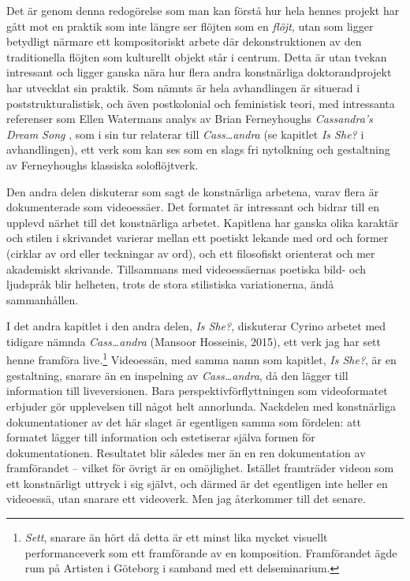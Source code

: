 \documentclass[11pt]{article}
\begin{document}
Det är genom denna redogörelse som man kan förstå hur hela hennes projekt har gått mot en praktik som inte längre ser flöjten som en \emph{flöjt}, utan som ligger betydligt närmare ett kompositoriskt arbete där dekonstruktionen av den traditionella flöjten som kulturellt objekt står i centrum. Detta är utan tvekan intressant och ligger ganska nära hur flera andra konstnärliga doktorandprojekt har utvecklat sin praktik. Som nämnts är hela avhandlingen är situerad i poststrukturalistisk, och även postkolonial och feministisk teori, med intressanta referenser som Ellen Watermans analys av Brian Ferneyhoughs \emph{Cassandra's Dream Song} \citep{Waterman1994}, som i sin tur relaterar till \emph{Cass\ldots{}andra} (se kapitlet \emph{Is She?} i avhandlingen), ett verk som kan ses som en slags fri nytolkning och gestaltning av Ferneyhoughs klassiska soloflöjtverk.

Den andra delen diskuterar som sagt de konstnärliga arbetena, varav flera är dokumenterade som videoessäer. Det formatet är intressant och bidrar till en upplevd närhet till det konstnärliga arbetet. Kapitlena har ganska olika karaktär och stilen i skrivandet varierar mellan ett poetiskt lekande med ord och former (cirklar av ord eller teckningar av ord), och ett filosofiskt orienterat och mer akademiskt skrivande. Tillsammans med videoessäernas poetiska bild- och ljudspråk blir helheten, trots de stora stilistiska variationerna, ändå sammanhållen.

I det andra kapitlet i den andra delen, \emph{Is She?}, diskuterar Cyrino arbetet med tidigare nämnda \emph{Cass\ldots{}andra} (Mansoor Hosseinis, 2015), ett verk jag har sett henne framföra live.\footnote{\emph{Sett}, snarare än hört då detta är ett minst lika mycket visuellt performanceverk som ett framförande av en komposition. Framförandet ägde rum på Artisten i Göteborg i samband med ett delseminarium.} Videoessän, med samma namn som kapitlet, \emph{Is She?}, är en gestaltning, snarare än en inspelning av \emph{Cass\ldots{}andra}, då den lägger till information till liveversionen. Bara perspektivförflyttningen som videoformatet erbjuder gör upplevelsen till något helt annorlunda. Nackdelen med konstnärliga dokumentationer av det här slaget är egentligen samma som fördelen: att formatet lägger till information och estetiserar själva formen för dokumentationen. Resultatet blir således mer än en ren dokumentation av framförandet -- vilket för övrigt är en omöjlighet. Istället framträder videon som ett konstnärligt uttryck i sig självt, och därmed är det egentligen inte heller en videoessä, utan snarare ett videoverk. Men jag återkommer till det senare.
\end{document}
